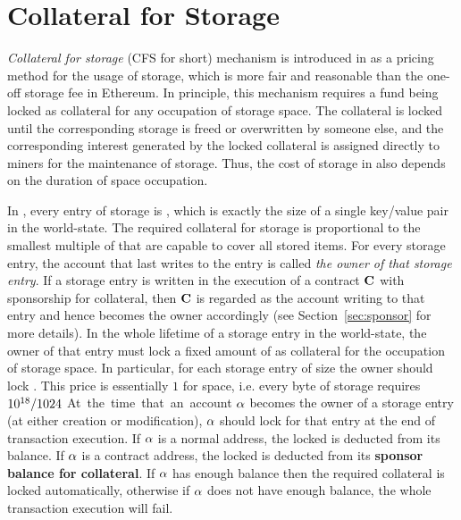 
\section{Collateral for Storage}
\label{sec:collateral}

\emph{Collateral for storage} (CFS for short) mechanism is introduced in \name as a pricing method for the usage of storage,
which is more fair and reasonable 
than the one-off storage fee in Ethereum. 
% 
In principle, this mechanism requires a fund being locked as collateral for any occupation of storage space.
The collateral is locked until the corresponding storage is freed or overwritten by someone else,
and the corresponding interest generated by the locked collateral is assigned directly to miners for the maintenance of storage.
Thus, the cost of storage in \name also depends on the duration of space occupation. 

In \name, every entry of storage is \sunitsize, which is exactly the size of a single key/value pair in the world-state.
The required collateral for storage is proportional to the smallest multiple of \sunitsize that are capable to cover all stored items.
For every storage entry, the account that last writes to the entry is 
called \emph{the owner of that storage entry}.
If a storage entry is written in the execution of a contract $\mathbf{C}$ with sponsorship for collateral, 
then $\mathbf{C}$ is regarded as the account writing to that entry and hence becomes the owner accordingly (see Section~\ref{sec:sponsor} for more details).
In the whole lifetime of a storage entry in the world-state, 
the owner of that entry must lock a fixed amount of \cfx as collateral for the occupation of storage space. 
In particular, for each storage entry of size \sunitsize the owner should lock \sunitprice. 
This price is essentially $1$ \cfx for \storagepertoken space,
i.e. every byte of storage requires $10^{18}/1024$ \unit.

At the time that an account $\mathbf{\alpha}$ becomes the owner of a storage entry (at either creation or modification), $\mathbf{\alpha}$ should lock \sunitprice for that entry at the end of transaction execution.
If $\mathbf{\alpha}$ is a normal address, the locked \sunitprice is deducted from its balance. If $\mathbf{\alpha}$ is a contract address, the locked \sunitprice is deducted from its \textbf{sponsor balance for collateral}.
If $\mathbf{\alpha}$ has enough balance then the required collateral is locked automatically,
otherwise if $\mathbf{\alpha}$ does not have enough balance, the whole transaction execution will fail.

